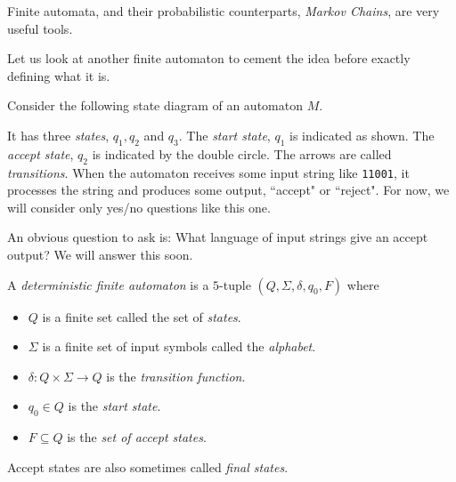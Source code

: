 Finite automata, and their probabilistic counterparts, \textit{Markov Chains}, are very useful tools.

Let us look at another finite automaton to cement the idea before exactly defining what it is.

\begin{example}
Consider the following state diagram of an automaton $M$.
\begin{center}
\end{center}
It has three \textit{states}, $q_1, q_2$ and $q_3$. The \textit{start state}, $q_1$ is indicated as shown. The \textit{accept state}, $q_2$ is indicated by the double circle. The arrows are called \textit{transitions}. When the automaton receives some input string like \texttt{11001}, it processes the string and produces some output, ``accept" or ``reject". For now, we will consider only yes/no questions like this one.

An obvious question to ask is: What language of input strings give an accept output? We will answer this soon.
\end{example}

\begin{definition}
A \textit{deterministic finite automaton} is a $5$-tuple $(Q,\Sigma, \delta, q_0, F)$ where
\begin{itemize}
	\item $Q$ is a finite set called the set of \textit{states}.
	\item $\Sigma$ is a finite set of input symbols called the \textit{alphabet}.
	\item $\delta:Q\times\Sigma\to Q$ is the \textit{transition function}.
	\item $q_0\in Q$ is the \textit{start state}.
	\item $F\subseteq Q$ is the \textit{set of accept states}.
\end{itemize}
\end{definition}

Accept states are also sometimes called \textit{final states}.

